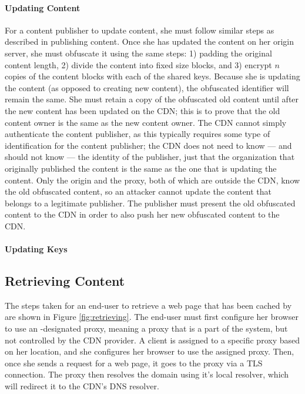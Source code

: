 \paragraph{Updating Content}
For a content publisher to update content, she must follow similar steps as described in publishing content.  
Once she has updated the content on her origin server, she must obfuscate it using the same steps: 1) padding the 
original content length, 2) divide the content into fixed size blocks, and 3) encrypt $n$ copies of the content blocks 
with each of the shared keys.  Because she is updating the content (as opposed to creating new content), the 
obfuscated identifier will remain the same.  She must 
retain a copy of the obfuscated old content until after the new content has been updated on the CDN; this is to prove 
that the old content owner is the same as the new content owner.  The CDN cannot simply authenticate the content publisher, as this 
typically requires some type of identification for the content publisher; the CDN does not need to know --- and should not know --- 
the identity of the publisher, just that the organization that originally published the content is the same as the one that is 
updating the content.  Only the origin and the proxy, both of which are 
outside the CDN, know the old obfuscated content, so an attacker cannot update the content that belongs to 
a legitimate publisher.  The publisher must present the old obfuscated content to the CDN in order to also push 
her new obfuscated content to the CDN. 

\paragraph{Updating Keys}

\subsection{Retrieving Content}
The steps taken for an end-user to retrieve a web page that has been cached by \system{} are shown in Figure \ref{fig:retrieving}.  
The end-user must first configure her browser to use an \system{}-designated proxy, meaning a proxy that is a part of the system, but not controlled by the 
CDN provider.  A client is assigned to a 
specific proxy based on her location, and she configures her browser to use the assigned proxy.    Then, once she sends a request for a 
web page, it goes to the proxy via a TLS connection.  The proxy then resolves the domain using it's local resolver, which will 
redirect it to the CDN's DNS resolver. 

